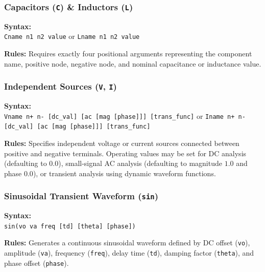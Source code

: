 \subsubsection{Capacitors (\texttt{C}) \& Inductors (\texttt{L})}
\begin{compactitem}
    \item \textbf{Syntax:} \\
    \texttt{Cname n1 n2 value} or \texttt{Lname n1 n2 value}
    \item \textbf{Rules:} Requires exactly four positional arguments representing the component name, positive node, negative node, and nominal capacitance or inductance value.
\end{compactitem}

\subsubsection{Independent Sources (\texttt{V}, \texttt{I})}
\begin{compactitem}
    \item \textbf{Syntax:} \\
    \texttt{Vname n+ n- [dc\_val] [ac [mag [phase]]] [trans\_func]} or \texttt{Iname n+ n- [dc\_val] [ac [mag [phase]]] [trans\_func]}
    \item \textbf{Rules:} Specifies independent voltage or current sources connected between positive and negative terminals. Operating values may be set for DC analysis (defaulting to $0.0$), small-signal AC analysis (defaulting to magnitude $1.0$ and phase $0.0$), or transient analysis using dynamic waveform functions.
\end{compactitem}

\subsubsection{Sinusoidal Transient Waveform (\texttt{sin})}
\begin{compactitem}
    \item \textbf{Syntax:} \\
    \texttt{sin(vo va freq [td] [theta] [phase])}
    \item \textbf{Rules:} Generates a continuous sinusoidal waveform defined by DC offset (\texttt{vo}), amplitude (\texttt{va}), frequency (\texttt{freq}), delay time (\texttt{td}), damping factor (\texttt{theta}), and phase offset (\texttt{phase}).
\end{compactitem}

